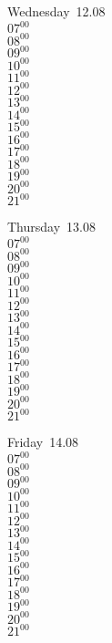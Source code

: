 \documentclass[11pt,a4paper]{book}\usepackage[]{graphicx}\usepackage[]{color}
\begin{document}
\begin{weekdaybox}
  Wednesday~12.08\\
  { 
  \vfill
  $07^{00}$\\
$08^{00}$\\
$09^{00}$\\
$10^{00}$\\
$11^{00}$\\
$12^{00}$\\
$13^{00}$\\
$14^{00}$\\
$15^{00}$\\
$16^{00}$\\
$17^{00}$\\
$18^{00}$\\
$19^{00}$\\
$20^{00}$\\
$21^{00}$\\
  }
\end{weekdaybox}
\clearpage
\begin{headerbox}
\end{headerbox}
\begin{weekdaybox}
  Thursday~13.08\\
  { 
  \vfill
  $07^{00}$\\
$08^{00}$\\
$09^{00}$\\
$10^{00}$\\
$11^{00}$\\
$12^{00}$\\
$13^{00}$\\
$14^{00}$\\
$15^{00}$\\
$16^{00}$\\
$17^{00}$\\
$18^{00}$\\
$19^{00}$\\
$20^{00}$\\
$21^{00}$\\
  }
\end{weekdaybox} 
\begin{weekdaybox}
  Friday~14.08\\
  { 
  \vfill
  $07^{00}$\\
$08^{00}$\\
$09^{00}$\\
$10^{00}$\\
$11^{00}$\\
$12^{00}$\\
$13^{00}$\\
$14^{00}$\\
$15^{00}$\\
$16^{00}$\\
$17^{00}$\\
$18^{00}$\\
$19^{00}$\\
$20^{00}$\\
$21^{00}$\\
  }
\end{weekdaybox}
\end{document}
